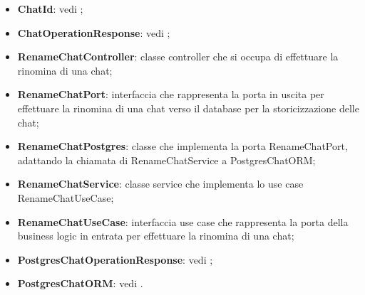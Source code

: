 \documentclass[10pt, a4paper]{article}
\begin{document}
\begin{itemize}
    \item \textbf{ChatId}: vedi ;
    \item \textbf{ChatOperationResponse}: vedi ;
    \item \label{RenameChatController}\textbf{RenameChatController}: classe controller che si occupa di effettuare la rinomina di una chat;%
    \item \label{RenameChatPort}\textbf{RenameChatPort}: interfaccia che rappresenta la porta in uscita per effettuare la rinomina di una chat verso il database per la storicizzazione delle chat;
    \item \label{RenameChatPostgres}\textbf{RenameChatPostgres}: classe che implementa la porta RenameChatPort, adattando la chiamata di RenameChatService a PostgresChatORM;
    \item \label{RenameChatService}\textbf{RenameChatService}: classe service che implementa lo use case RenameChatUseCase;
    \item \label{RenameChatUseCase}\textbf{RenameChatUseCase}: interfaccia use case che rappresenta la porta della business logic in entrata per effettuare la rinomina di una chat;
    \item \textbf{PostgresChatOperationResponse}: vedi ;
    \item \textbf{PostgresChatORM}: vedi . 
\end{itemize}
\end{document}
